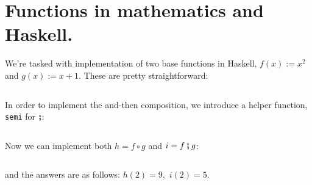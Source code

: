 \section{ Functions in mathematics and Haskell. } 
We're tasked with implementation of two base functions in Haskell, $f(x) := x^2$ and $g(x) := x + 1.$
These are pretty straightforward:
\inputminted[firstline=7,
             lastline=11,
             fontsize=\footnotesize, tabsize=4]{haskell}{ps1.hs}
In order to implement the and-then composition, we introduce a helper function, {\tt semi} for $\fatsemi$:
\inputminted[firstline=13,
             lastline=14,
             fontsize=\footnotesize, tabsize=4]{haskell}{ps1.hs}
Now we can implement both $h = f \circ g$ and $i = f \fatsemi g$:
\inputminted[firstline=16,
             lastline=20,
             fontsize=\footnotesize, tabsize=4]{haskell}{ps1.hs}
and the answers are as follows: $h(2) = 9,$ $i(2) = 5.$
